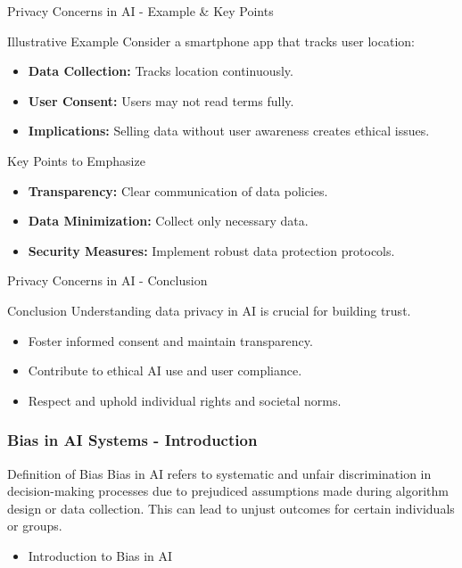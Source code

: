 \documentclass[aspectratio=169]{beamer}
\begin{document}
\begin{frame}[fragile]{Privacy Concerns in AI - Example & Key Points}
    \begin{block}{Illustrative Example}
        Consider a smartphone app that tracks user location:
        \begin{itemize}
            \item \textbf{Data Collection:} Tracks location continuously.
            \item \textbf{User Consent:} Users may not read terms fully.
            \item \textbf{Implications:} Selling data without user awareness creates ethical issues.
        \end{itemize}
    \end{block}

    \begin{block}{Key Points to Emphasize}
        \begin{itemize}
            \item \textbf{Transparency:} Clear communication of data policies.
            \item \textbf{Data Minimization:} Collect only necessary data.
            \item \textbf{Security Measures:} Implement robust data protection protocols.
        \end{itemize}
    \end{block}
\end{frame}

\begin{frame}[fragile]{Privacy Concerns in AI - Conclusion}
    \begin{block}{Conclusion}
        Understanding data privacy in AI is crucial for building trust. 
        \begin{itemize}
            \item Foster informed consent and maintain transparency.
            \item Contribute to ethical AI use and user compliance.
            \item Respect and uphold individual rights and societal norms.
        \end{itemize}
    \end{block}
\end{frame}

\begin{frame}[fragile]
    \frametitle{Bias in AI Systems - Introduction}
    \begin{block}{Definition of Bias}
        Bias in AI refers to systematic and unfair discrimination in decision-making processes due to prejudiced assumptions made during algorithm design or data collection. This can lead to unjust outcomes for certain individuals or groups.
    \end{block}

    \begin{itemize}
        \item Introduction to Bias in AI
    \end{itemize}
\end{frame}
\end{document}
